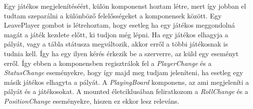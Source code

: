\documentclass[a4paper,twoside]{article}
\begin{document}
Egy játékos megjelenítéséért, külön komponenst hoztam létre, mert így jobban el tudtam szeparálni a különböző felelősségeket a komponensek között. Egy LeavePlayer gombot is létrehoztam, hogy esetleg ha egy játékos meggondolná magát a játék kezdete előtt, ki tudjon még lépni. 
Ha egy játékos elhagyja a pályát, vagy a tábla státusza megváltozik, akkor erről a többi játékosnak is tudnia kell. Így ha egy ilyen kérés érkezik be a szerverre, az küld egy eseményt erről. Így ebben a komponensben regisztrálok fel a \textit{PlayerChange} és a \textit{StatusChange} eseményekre, hogy így majd meg tudjam jeleníteni, ha esetleg egy másik játékos elhagyta a pályát. A \textit{PlayingBoard} komponens, az ami megjeleníti a pályát és a játékosokat. A mounted életciklusában feliratkozom a \textit{RollChange} és a \textit{PositionChange} eseményekre, hiszen ez ekkor lesz releváns. 
\end{document}
